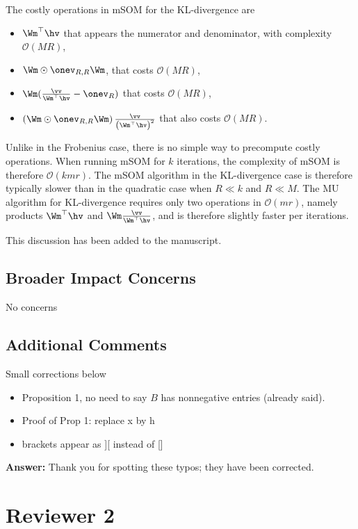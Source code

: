 \documentclass[10pt]{article} %
\newcommand{\answer}[1]{{\textbf{Answer:} \color{blue} #1}}
\begin{document}
{The costly operations in mSOM for the KL-divergence are
\begin{itemize}
    \item $\Wm^\top\hv$ that appears the numerator and denominator, with complexity $\mathcal{O}(MR)$,
    \item $\Wm\odot \onev_{R,R}\Wm$, that costs $\mathcal{O}(MR)$,
    \item $\Wm(\frac{\vv}{\Wm^\top\hv}-\onev_R)$ that costs $\mathcal{O}(MR)$,
    \item $\left(\Wm\odot \onev_{R,R}\Wm\right) \frac{\vv}{\left(\Wm^\top\hv\right)^2}$ that also costs $\mathcal{O}(MR)$.
\end{itemize}
Unlike in the Frobenius case, there is no simple way to precompute costly operations. When running mSOM for $k$ iterations, the complexity of mSOM is therefore $\mathcal{O}(kmr)$. The mSOM algorithm in the KL-divergence case is therefore typically slower than in the quadratic case when $R\ll k$ and $R \ll M$. The MU algorithm for KL-divergence requires only two operations in $\mathcal{O}(mr)$, namely products $\Wm^\top\hv$ and $\Wm\frac{\vv}{\Wm^\top\hv}$, and is therefore slightly faster per iterations.

This discussion has been added to the manuscript.
}

\subsection{Broader Impact Concerns}
No concerns

\subsection{Additional Comments}
Small corrections below

\begin{itemize}
    \item Proposition 1, no need to say $B$ has nonnegative entries (already said).
    \item Proof of Prop 1: replace x by h
    \item brackets appear as ][ instead of []
\end{itemize}

\answer{Thank you for spotting these typos; they have been corrected.}

\section{Reviewer 2}
\end{document}
